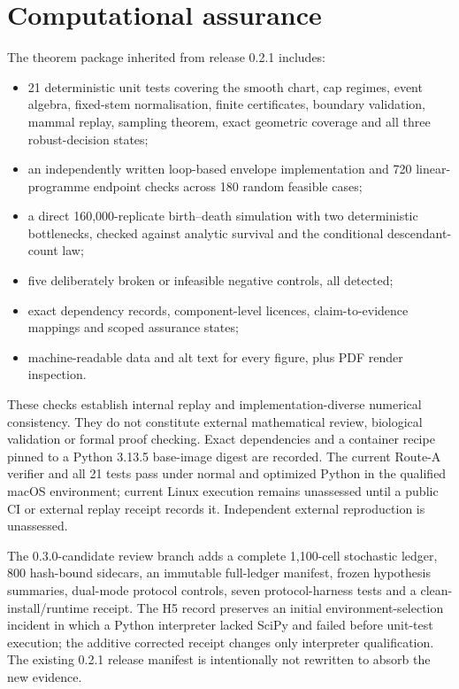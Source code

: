 \documentclass[11pt]{article}
\theoremstyle{definition}
\begin{document}
\section{Computational assurance}
The theorem package inherited from release 0.2.1 includes:
\begin{itemize}
\item 21 deterministic unit tests covering the smooth chart, cap regimes, event algebra, fixed-stem normalisation, finite certificates, boundary validation, mammal replay, sampling theorem, exact geometric coverage and all three robust-decision states;
\item an independently written loop-based envelope implementation and 720 linear-programme endpoint checks across 180 random feasible cases;
\item a direct 160,000-replicate birth--death simulation with two deterministic bottlenecks, checked against analytic survival and the conditional descendant-count law;
\item five deliberately broken or infeasible negative controls, all detected;
\item exact dependency records, component-level licences, claim-to-evidence mappings and scoped assurance states;
\item machine-readable data and alt text for every figure, plus PDF render inspection.
\end{itemize}
These checks establish internal replay and implementation-diverse numerical consistency. They do not constitute external mathematical review, biological validation or formal proof checking. Exact dependencies and a container recipe pinned to a Python 3.13.5 base-image digest are recorded. The current Route-A verifier and all 21 tests pass under normal and optimized Python in the qualified macOS environment; current Linux execution remains unassessed until a public CI or external replay receipt records it. Independent external reproduction is unassessed.

The 0.3.0-candidate review branch adds a complete 1,100-cell stochastic ledger, 800 hash-bound sidecars, an immutable full-ledger manifest, frozen hypothesis summaries, dual-mode protocol controls, seven protocol-harness tests and a clean-install/runtime receipt. The H5 record preserves an initial environment-selection incident in which a Python interpreter lacked SciPy and failed before unit-test execution; the additive corrected receipt changes only interpreter qualification. The existing 0.2.1 release manifest is intentionally not rewritten to absorb the new evidence.
\end{document}
